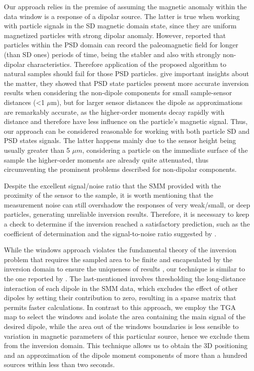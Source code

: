 Our approach relies in the premise of assuming the magnetic anomaly within 
the data window is a response of a dipolar source. The latter is true when working 
with particle signals in the SD magnetic domain state, since they are uniform magnetized 
particles with strong dipolar anomaly. However, \cite{Nagy2017} reported
that particles within the PSD domain can record the paleomagnetic field for longer (than SD ones) periods
of time, being the stabler and also with strongly non-dipolar characteristics. 
Therefore application of the proposed algorithm to natural samples should fail for those PSD
particles. \cite{CortesOrtuno2022} give important insights about the matter, they 
showed that PSD state particles present more accurate inversion results when considering the non-dipole components for
small sample-sensor distances (\textless 1 $\mu$m), but for larger sensor
distances the dipole as approximations are remarkably accurate, as the
higher-order moments decay rapidly with distance and therefore have less
influence on the particle's magnetic signal. Thus, our approach can be
considered reasonable for working with both particle SD and PSD states signals. 
The latter happens mainly due to the sensor height being
usually greater than 5 $\mu m$, considering a particle on the immediate
surface of the sample the higher-order moments are already quite attenuated, thus 
circumventing the prominent problems described for non-dipolar components.

Despite the excellent signal/noise ratio that the SMM provided with the
proximity of the sensor to the sample, it is worth mentioning that the
measurement noise can still overshadow the responses of very weak/small, or
deep particles, generating unreliable inversion results. Therefore, it is
necessary to keep a check to determine if the inversion reached a satisfactory
prediction, such as the coefficient of determination and the
signal-to-noise ratio suggested by \citep{CortesOrtuno2021}.

While the windows approach violates the fundamental theory of the inversion problem that 
requires the sampled area to be finite and encapsulated by the inversion domain to ensure 
the uniqueness of results \citep{Baratchart2013,Lima2013}, our technique is similar to the 
one reported by \cite{Weiss2007}. The last-mentioned involves thresholding the long-distance interaction 
of each dipole in the SMM data, which excludes the effect of other dipoles by setting their 
contribution to zero, resulting in a sparse matrix that permits faster calculations. In contrast 
to this approach, we employ the TGA map to select the windows and isolate the area containing 
the main signal of the desired dipole, while the area out of the windows boundaries is less sensible to 
variation in magnetic parameters of this particular source, hence we exclude them from the inversion 
domain. This technique allows us to obtain the 3D positioning and an approximation of the dipole moment 
components of more than a hundred sources within less than two seconds.


